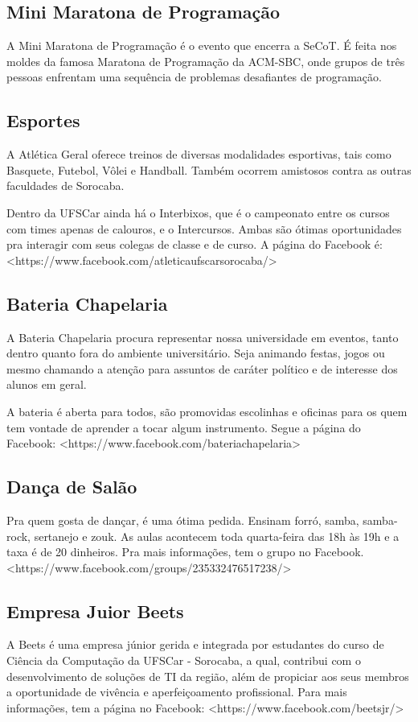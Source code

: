 \subsection{Mini Maratona de Programação}
A Mini Maratona de Programação é o evento que encerra a SeCoT. É feita nos moldes da famosa Maratona de Programação da ACM-SBC, onde grupos de três pessoas enfrentam uma sequência de problemas desafiantes de programação.

\subsection{Esportes}
A Atlética Geral oferece treinos de diversas modalidades esportivas, tais como Basquete, Futebol, Vôlei e Handball. Também ocorrem amistosos contra as outras faculdades de Sorocaba.

Dentro da UFSCar ainda há o Interbixos, que é o campeonato entre os cursos com times apenas de calouros, e o Intercursos. Ambas são ótimas oportunidades pra interagir com seus colegas de classe e de curso. A página do Facebook é: <https://www.facebook.com/atleticaufscarsorocaba/>

\subsection{Bateria Chapelaria}
A Bateria Chapelaria procura representar nossa universidade em eventos, tanto dentro quanto fora do ambiente universitário. Seja animando festas, jogos ou mesmo chamando a atenção para assuntos de caráter político e de interesse dos alunos em geral.

A bateria é aberta para todos, são promovidas escolinhas e oficinas para os quem tem vontade de aprender a tocar algum instrumento. Segue a página do Facebook: <https://www.facebook.com/bateriachapelaria>

\subsection{Dança de Salão}
Pra quem gosta de dançar, é uma ótima pedida. Ensinam forró, samba, samba-rock, sertanejo e zouk. As aulas acontecem toda quarta-feira das 18h às 19h e a taxa é de 20 dinheiros. Pra mais informações, tem o grupo no Facebook. <https://www.facebook.com/groups/235332476517238/>

\subsection{Empresa Juior Beets}
A Beets é uma empresa júnior gerida e integrada por estudantes do curso de Ciência da Computação da UFSCar - Sorocaba, a qual, contribui com o desenvolvimento de soluções de TI da região, além de propiciar aos seus membros a oportunidade de vivência e aperfeiçoamento profissional. Para mais informações, tem a página no Facebook: <https://www.facebook.com/beetsjr/>

